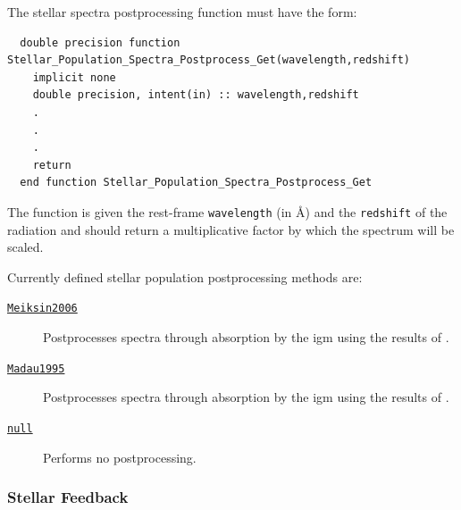 The stellar spectra postprocessing function must have the form:
\begin{verbatim}
  double precision function Stellar_Population_Spectra_Postprocess_Get(wavelength,redshift)
    implicit none
    double precision, intent(in) :: wavelength,redshift
    .
    .
    .
    return
  end function Stellar_Population_Spectra_Postprocess_Get
\end{verbatim}
The function is given the rest-frame {\tt wavelength} (in \AA) and the {\tt redshift} of the radiation and should return a multiplicative factor by which the spectrum will be scaled.

Currently defined stellar population postprocessing methods are:
\begin{description}
\item [\hyperlink{stellar_populations.spectra.postprocess.Meiksin2006.F90:stellar_population_spectra_postprocessing_meiksin2006}{{\tt Meiksin2006}}] Postprocesses spectra through absorption by the \gls{igm} using the results of \cite{meiksin_colour_2006}.
\item [\hyperlink{stellar_populations.spectra.postprocess.Madau1995.F90:stellar_population_spectra_postprocessing_madau1995}{{\tt Madau1995}}] Postprocesses spectra through absorption by the \gls{igm} using the results of \cite{madau_radiative_1995}.
\item [\hyperlink{stellar_populations.spectra.postprocess.null.F90:stellar_population_spectra_postprocess_null}{{\tt null}}] Performs no postprocessing.
\end{description}

\subsubsection{Stellar Feedback}

